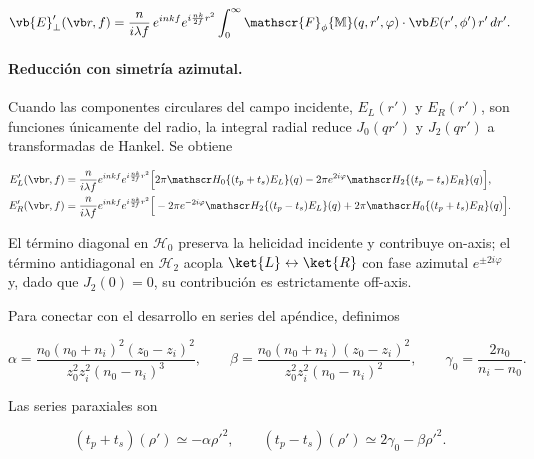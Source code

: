 \begin{equation}
  \vb{E}'_\perp(\vb r, f)
  =
  \frac{n}{i\lambda f}\,e^{inkf}e^{i\frac{nk}{2f}r^2}
  \int_0^\infty
  \mathscr{F}_\phi\{\mathbb{M}\}(q, r', \varphi) \cdot \vb E(r', \phi')\,r'\,dr'.
  \label{eq:E_field_general_circular}
\end{equation}

\paragraph{Reducción con simetría azimutal.}
Cuando las componentes circulares del campo incidente, $E_L(r')$ y $E_R(r')$, son funciones únicamente del radio, la integral radial reduce $J_0(qr')$ y $J_2(qr')$ a transformadas de Hankel. Se obtiene

\begin{equation}
\begin{aligned}
E'_L(\vb r,f)
&=
\frac{n}{i\lambda f}
e^{inkf}
e^{i\frac{nk}{2f}r^2}
\Big[
2\pi
\mathscr H_0\{(t_p+t_s)E_L\}(q)
-
2\pi e^{2i\varphi}
\mathscr H_2\{(t_p-t_s)E_R\}(q)
\Big],
\\
E'_R(\vb r,f)
&=
\frac{n}{i\lambda f}
e^{inkf}
e^{i\frac{nk}{2f}r^2}
\Big[
-2\pi e^{-2i\varphi}
\mathscr H_2\{(t_p-t_s)E_L\}(q)
+
2\pi
\mathscr H_0\{(t_p+t_s)E_R\}(q)
\Big].
\end{aligned}
\label{eq:E_L_E_R_Hankel}
\end{equation}

El término diagonal en $\mathscr{H}_0$ preserva la helicidad incidente y contribuye on-axis; el término antidiagonal en $\mathscr{H}_2$ acopla $\ket{L}\leftrightarrow\ket{R}$ con fase azimutal $e^{\pm 2i\varphi}$ y, dado que $J_2(0)=0$, su contribución es estrictamente off-axis.

Para conectar con el desarrollo en series del apéndice, definimos

\begin{equation}
\alpha
=
\frac{
n_0(n_0+n_i)^2(z_0-z_i)^2
}
{
z_0^2 z_i^2 (n_0-n_i)^3
},
\qquad
\beta
=
\frac{
n_0(n_0+n_i)(z_0-z_i)^2
}
{
z_0^2 z_i^2 (n_0-n_i)^2
},
\qquad
\gamma_0
=
\frac{2n_0}{n_i-n_0}.
\label{eq:alpha_beta_gamma_def}
\end{equation}

Las series paraxiales son

\begin{equation}
(t_p+t_s)(\rho')
\simeq
-\alpha\rho'^2,
\qquad
(t_p-t_s)(\rho')
\simeq
2\gamma_0-\beta\rho'^2.
\label{eq:t_plus_t_minus_paraxial}
\end{equation}


